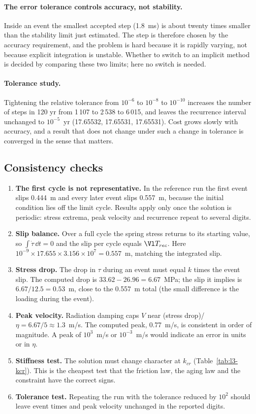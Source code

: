 \paragraph{The error tolerance controls accuracy, not stability.} Inside an event the smallest accepted step (1.8~ms) is about twenty times smaller than the stability limit just estimated. The step is therefore chosen by the accuracy requirement, and the problem is hard because it is rapidly varying, not because explicit integration is unstable. Whether to switch to an implicit method is decided by comparing these two limits; here no switch is needed.

\paragraph{Tolerance study.} Tightening the relative tolerance from $10^{-6}$ to $10^{-8}$ to $10^{-10}$ increases the number of steps in 120 yr from 1\,107 to 2\,538 to 6\,015, and leaves the recurrence interval unchanged to $10^{-5}$~yr (17.65532, 17.65531, 17.65531). Cost grows slowly with accuracy, and a result that does not change under such a change in tolerance is converged in the sense that matters.

\subsection{Consistency checks}

\begin{enumerate}[itemsep=1pt,topsep=2pt]
\item \textbf{The first cycle is not representative.} In the reference run the first event slips 0.444~m and every later event slips 0.557~m, because the initial condition lies off the limit cycle. Results apply only once the solution is periodic: stress extrema, peak velocity and recurrence repeat to several digits.
\item \textbf{Slip balance.} Over a full cycle the spring stress returns to its starting value, so $\int\dot\tau\,\dd t=0$ and the slip per cycle equals $\Vl T_{rec}$. Here $10^{-9}\times17.655\times3.156\times10^{7}=0.557$~m, matching the integrated slip.
\item \textbf{Stress drop.} The drop in $\tau$ during an event must equal $k$ times the event slip. The computed drop is $33.62-26.96=6.67$~MPa; the slip it implies is $6.67/12.5=0.53$~m, close to the 0.557~m total (the small difference is the loading during the event).
\item \textbf{Peak velocity.} Radiation damping caps $V$ near (stress drop)/$\eta=6.67/5\approx1.3$~m/s. The computed peak, 0.77~m/s, is consistent in order of magnitude. A peak of $10^{3}$~m/s or $10^{-3}$~m/s would indicate an error in units or in $\eta$.
\item \textbf{Stiffness test.} The solution must change character at $k_{cr}$ (Table~\ref{tab:l3-kcr}). This is the cheapest test that the friction law, the aging law and the constraint have the correct signs.
\item \textbf{Tolerance test.} Repeating the run with the tolerance reduced by $10^2$ should leave event times and peak velocity unchanged in the reported digits.
\end{enumerate}

